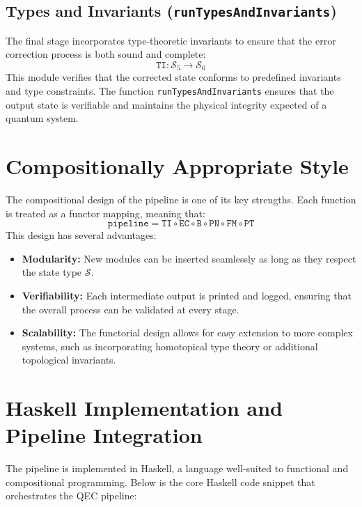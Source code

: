 \documentclass[11pt]{article}
\begin{document}
\subsection{Types and Invariants (\texttt{runTypesAndInvariants})}
The final stage incorporates type-theoretic invariants to ensure that the error correction process is both sound and complete:
\[
\texttt{TI}: \mathcal{S}_5 \to \mathcal{S}_6
\]
This module verifies that the corrected state conforms to predefined invariants and type constraints. The function \texttt{runTypesAndInvariants} ensures that the output state is verifiable and maintains the physical integrity expected of a quantum system.

\section{Compositionally Appropriate Style}
The compositional design of the pipeline is one of its key strengths. Each function is treated as a functor mapping, meaning that:
\[
\texttt{pipeline} = \texttt{TI} \circ \texttt{EC} \circ \texttt{B} \circ \texttt{PN} \circ \texttt{FM} \circ \texttt{PT}
\]
This design has several advantages:
\begin{itemize}
    \item \textbf{Modularity:} New modules can be inserted seamlessly as long as they respect the state type $\mathcal{S}$.
    \item \textbf{Verifiability:} Each intermediate output is printed and logged, ensuring that the overall process can be validated at every stage.
    \item \textbf{Scalability:} The functorial design allows for easy extension to more complex systems, such as incorporating homotopical type theory or additional topological invariants.
\end{itemize}

\section{Haskell Implementation and Pipeline Integration}
The pipeline is implemented in Haskell, a language well-suited to functional and compositional programming. Below is the core Haskell code snippet that orchestrates the QEC pipeline:
\end{document}
